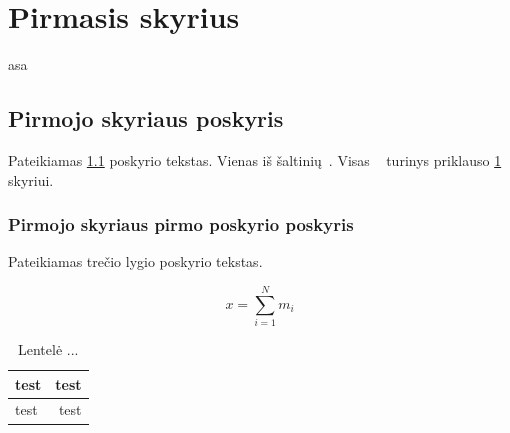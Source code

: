 \documentclass[a4paper,12pt,fleqn]{article}
\begin{document}













\newpage
\section{Pirmasis skyrius}
\label{sec:motivation}

asa \cite{recurrence-plot}



\subsection{Pirmojo skyriaus poskyris}
\label{sec:example}
Pateikiamas \ref{sec:example} poskyrio tekstas. Vienas iš šaltinių~\cite{KTZ}. Visas ~\cite{KTV} turinys priklauso \ref{sec:motivation} skyriui.

\subsubsection{Pirmojo skyriaus pirmo poskyrio poskyris}
\label{sec:data}
Pateikiamas trečio lygio poskyrio tekstas.

\begin{equation}
  x = \sum_{i=1}^N m_i
\end{equation}

\begin{table}[!ht]\centering
  \caption{Lentelė ... }
  \label{tabl:table}
  \begin{tabular}{l|r|}
    test & test \\ \hline
    test & test \\
  \end{tabular}
\end{table}
\end{document}

